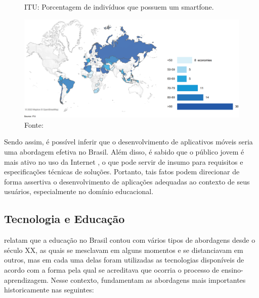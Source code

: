 \begin{figure}[htbp]
\caption{ITU: Porcentagem de indivíduos que possuem um smartfone.}
\label{fig:itu-donos-smartfones}
\centerline{\includegraphics[width=1\textwidth]{images/itu-individuals-owning-mobile-phone.png}}
\caption*{Fonte: }
\end{figure}

Sendo assim, é possível inferir que o desenvolvimento de aplicativos móveis seria uma abordagem efetiva no Brasil. Além disso, é sabido que o público jovem é mais ativo no uso da Internet \cite{Itu2020}, o que pode servir de insumo para requisitos e especificações técnicas de soluções. Portanto, tais fatos podem direcionar de forma assertiva o desenvolvimento de aplicações adequadas ao contexto de seus usuários, especialmente no domínio educacional.%

\subsection{Tecnologia e Educação}
\label{fundamentacao-teorica:tic:educacao}

 relatam que a educação no Brasil contou com vários tipos de abordagens desde o século XX, as quais se mesclavam em alguns momentos e se distanciavam em outros, mas em cada uma delas foram utilizadas as tecnologias disponíveis de acordo com a forma pela qual se acreditava que ocorria o processo de ensino-aprendizagem. Nesse contexto,  fundamentam as abordagens mais importantes historicamente nas seguintes:

